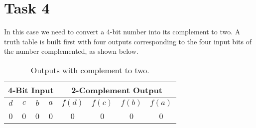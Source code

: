 



\section*{Task 4}
    In this case we need to convert a 4-bit number into its complement 
    to two. A truth table is built first with four outputs corresponding 
    to the four input bits of the number complemented, as shown below.
    \begin{table}[H]
        \begin{center}
        \begin{tabular}{|c|c|c|c||c|c|c|c|}
        \hline
        \multicolumn{4}{|c||}{4-Bit Input} & \multicolumn{4}{|c|}{2-Complement Output}
        \\ \hline
        $d$ & $c$ & $b$ & $a$ & $f(d)$ & $f(c)$ & $f(b)$ & $f(a)$\\
        \hline \hline
        0 & 0 & 0 & 0 & 0 & 0 & 0 & 0\\ \hline
        \end{tabular}
        \caption{Outputs with complement to two.}
        \end{center}
        \end{table}
